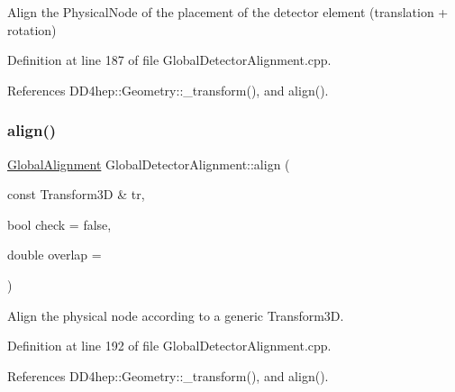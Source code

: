 Align the Physical\+Node of the placement of the detector element (translation + rotation) 



Definition at line 187 of file Global\+Detector\+Alignment.\+cpp.



References D\+D4hep\+::\+Geometry\+::\+\_\+transform(), and align().

\hypertarget{class_d_d4hep_1_1_alignments_1_1_global_detector_alignment_af25045f4135b7688c2ec8df38a4f6128}{}\label{class_d_d4hep_1_1_alignments_1_1_global_detector_alignment_af25045f4135b7688c2ec8df38a4f6128} 
\subsubsection{\texorpdfstring{align()}{align()}\hspace{0.1cm}{\footnotesize\ttfamily [4/10]}}
{\footnotesize\ttfamily \hyperlink{class_d_d4hep_1_1_alignments_1_1_global_alignment}{Global\+Alignment} Global\+Detector\+Alignment\+::align (\begin{DoxyParamCaption}\item[{const Transform3D \&}]{tr,  }\item[{bool}]{check = {\ttfamily false},  }\item[{double}]{overlap = {} }\end{DoxyParamCaption})}



Align the physical node according to a generic Transform3D. 



Definition at line 192 of file Global\+Detector\+Alignment.\+cpp.



References D\+D4hep\+::\+Geometry\+::\+\_\+transform(), and align().

\hypertarget{class_d_d4hep_1_1_alignments_1_1_global_detector_alignment_adbf2906a23e458e6d1630fecfe72678c}{}\label{class_d_d4hep_1_1_alignments_1_1_global_detector_alignment_adbf2906a23e458e6d1630fecfe72678c} 
